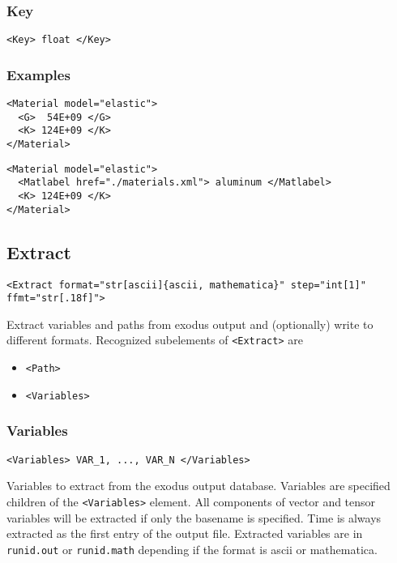 \documentclass[11pt]{report}
\newcommand{\tag}[1]{\texttt{<#1>}}
\begin{document}
\subsubsection{Key}
\begin{verbatim}
<Key> float </Key>
\end{verbatim}

\subsubsection{Examples}
\begin{verbatim}
<Material model="elastic">
  <G>  54E+09 </G>
  <K> 124E+09 </K>
</Material>
\end{verbatim}

\begin{verbatim}
<Material model="elastic">
  <Matlabel href="./materials.xml"> aluminum </Matlabel>
  <K> 124E+09 </K>
</Material>
\end{verbatim}

\subsection{Extract}
\begin{verbatim}
<Extract format="str[ascii]{ascii, mathematica}" step="int[1]" ffmt="str[.18f]">
\end{verbatim}
%
Extract variables and paths from exodus output and (optionally) write to
different formats. Recognized subelements of \tag{Extract} are
%
\begin{itemize}
  \item \tag{Path}
  \item \tag{Variables}
\end{itemize}

\subsubsection{Variables}
\begin{verbatim}
<Variables> VAR_1, ..., VAR_N </Variables>
\end{verbatim}
%
Variables to extract from the exodus output database. Variables are specified
children of the \tag{Variables} element. All components of vector and tensor
variables will be extracted if only the basename is specified. Time is always
extracted as the first entry of the output file.  Extracted variables are in
\texttt{runid.out} or \texttt{runid.math} depending if the format is ascii or
mathematica.
\end{document}
